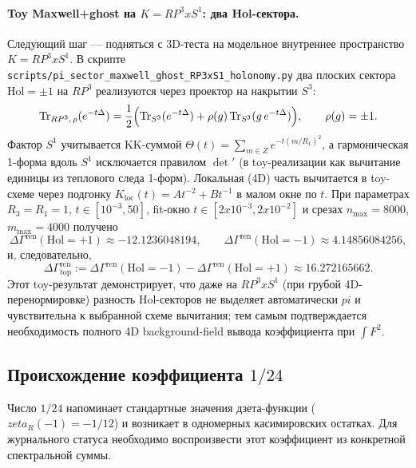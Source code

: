 \documentclass[12pt]{article}
\def\mathbb#1{#1}%
\def\pi{pi}%
\def\times{x}%
\def\zeta{zeta}%
\begin{document}
\paragraph{Toy Maxwell+ghost на \texorpdfstring{$K=\mathbb{RP}^3\times S^1$}{K=RP3xS1}: два Hol-сектора.}
Следующий шаг --- подняться с 3D-теста на модельное внутреннее пространство $K=\mathbb{RP}^3\times S^1$.
В скрипте \texttt{scripts/pi\_sector\_maxwell\_ghost\_RP3xS1\_holonomy.py} два плоских сектора $\mathrm{Hol}=\pm1$ на $\mathbb{RP}^3$ реализуются через проектор на накрытии $S^3$:
\begin{equation}
  \mathrm{Tr}_{\mathbb{RP}^3,\,\rho}(e^{-t\Delta})
  =\frac12\Bigl(\mathrm{Tr}_{S^3}(e^{-t\Delta})+\rho(g)\,\mathrm{Tr}_{S^3}(g\,e^{-t\Delta})\Bigr),
  \qquad \rho(g)=\pm1.
\end{equation}
Фактор $S^1$ учитывается KK-суммой $\Theta(t)=\sum_{m\in\mathbb{Z}}e^{-t(m/R_1)^2}$, а гармоническая 1-форма вдоль $S^1$ исключается правилом $\det'$ (в toy-реализации как вычитание единицы из теплового следа 1-форм).
Локальная (4D) часть вычитается в toy-схеме через подгонку $K_{\mathrm{loc}}(t)=A t^{-2}+B t^{-1}$ в малом окне по $t$.
При параметрах $R_3=R_1=1$, $t\in[10^{-3},50]$, fit-окно $t\in[2\times10^{-3},2\times10^{-2}]$ и срезах $n_{\max}=8000$, $m_{\max}=4000$ получено
\begin{equation}
  \Delta\Gamma^{\mathrm{ren}}(\mathrm{Hol}=+1)\approx -12.1236048194,
  \qquad
  \Delta\Gamma^{\mathrm{ren}}(\mathrm{Hol}=-1)\approx 4.14856084256,
\end{equation}
и, следовательно,
\begin{equation}
  \Delta\Gamma^{\mathrm{ren}}_{\mathrm{top}}
  :=
  \Delta\Gamma^{\mathrm{ren}}(\mathrm{Hol}=-1)-\Delta\Gamma^{\mathrm{ren}}(\mathrm{Hol}=+1)
  \approx 16.272165662.
\end{equation}
Этот toy-результат демонстрирует, что даже на $\mathbb{RP}^3\times S^1$ (при грубой 4D-перенормировке) разность Hol-секторов не выделяет автоматически $\pi$ и чувствительна к выбранной схеме вычитания; тем самым подтверждается необходимость полного 4D background-field вывода коэффициента при $\int F^2$.

\subsection{Происхождение коэффициента $1/24$}
Число $1/24$ напоминает стандартные значения дзета-функции ($\zeta_R(-1)=-1/12$) и возникает в одномерных касимировских остатках.
Для журнального статуса необходимо воспроизвести этот коэффициент из конкретной спектральной суммы.
\end{document}
